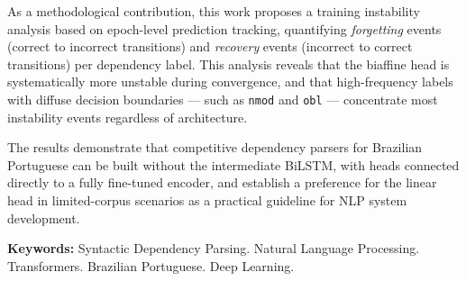 As a methodological contribution, this work proposes a training instability analysis based on
epoch-level prediction tracking, quantifying \textit{forgetting} events (correct to incorrect
transitions) and \textit{recovery} events (incorrect to correct transitions) per dependency
label. This analysis reveals that the biaffine head is systematically more unstable during
convergence, and that high-frequency labels with diffuse decision boundaries — such as
\texttt{nmod} and \texttt{obl} — concentrate most instability events regardless of architecture.

The results demonstrate that competitive dependency parsers for Brazilian Portuguese can be
built without the intermediate BiLSTM, with heads connected directly to a fully fine-tuned
encoder, and establish a preference for the linear head in limited-corpus scenarios as a
practical guideline for NLP system development.

\bigskip
\noindent\textbf{Keywords:} Syntactic Dependency Parsing. Natural Language Processing.
Transformers. Brazilian Portuguese. Deep Learning.
